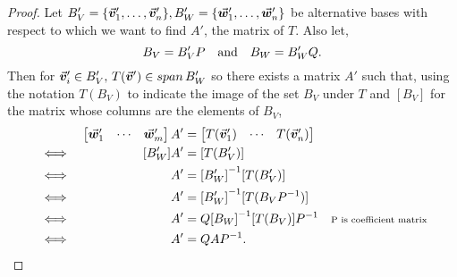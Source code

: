 \documentclass[../MathsNotesBase.tex]{subfiles}
\begin{document}
{		\bigskip
		\begin{proof}
			Let ${ B_V' = \{\vec{\bm{v}}_1',\dots,\vec{\bm{v}}_n'\}, B_W' = \{\vec{\bm{w}}_1',\dots,\vec{\bm{w}}_n'\} }$ be alternative bases with respect to which we want to find $A'$, the matrix of $T$. Also let,
			\[ B_V = B_V'P \hspace{10pt}\text{and}\hspace{10pt} B_W = B_W'Q. \]
			Then for ${ \vec{\bm{v}}_i' \in B_V',\, T(\vec{\bm{v}}') \in span\,B_W' }$ so there exists a matrix $A'$ such that, using the notation $T(B_V)$ to indicate the image of the set $B_V$ under $T$ and $[B_V]$ for the matrix whose columns are the elements of $B_V$,
			\begin{align*}
			&& \begin{bmatrix}
				\vec{\bm{w}}_1' & \cdots & \vec{\bm{w}}_m'
				\end{bmatrix}
				A'&=
				\begin{bmatrix}
				T(\vec{\bm{v}}_1') & \cdots & T(\vec{\bm{v}}_n')
				\end{bmatrix}  \\
			&\iff & [B_W']A' &= [T(B_V')] &\text{\scriptsize{}} \\
			&\iff & A' &= {[B_W']}^{-1}[T(B_V')] &\text{\scriptsize{}} \\
			&\iff & A' &= {[B_W']}^{-1}[T(B_V{P}^{-1})] &\text{\scriptsize{}} \\
			&\iff & A' &= Q{[B_W]}^{-1}[T(B_V)]{P}^{-1} &\text{\scriptsize{P is coefficient matrix}} \\
			&\iff & A' &= QA{P}^{-1}. &\qedhere \\
			\end{align*}
		\end{proof}
	
		\bigskip
}
\end{document}
